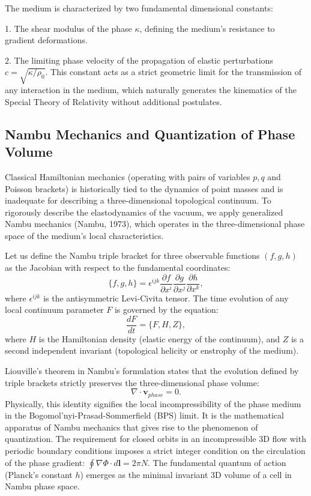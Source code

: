 \documentclass[12pt,a4paper]{article}
\begin{document}
The medium is characterized by two fundamental dimensional constants:

1. The shear modulus of the phase $\kappa$, defining the medium's resistance to gradient deformations.

2. The limiting phase velocity of the propagation of elastic perturbations $c = \sqrt{\kappa / \rho_0}$. This constant acts as a strict geometric limit for the transmission of any interaction in the medium, which naturally generates the kinematics of the Special Theory of Relativity without additional postulates.

\subsection{Nambu Mechanics and Quantization of Phase Volume}
Classical Hamiltonian mechanics (operating with pairs of variables $p, q$ and Poisson brackets) is historically tied to the dynamics of point masses and is inadequate for describing a three-dimensional topological continuum. To rigorously describe the elastodynamics of the vacuum, we apply generalized Nambu mechanics (Nambu, 1973), which operates in the three-dimensional phase space of the medium's local characteristics.

Let us define the Nambu triple bracket for three observable functions $(f, g, h)$ as the Jacobian with respect to the fundamental coordinates:
\begin{equation}
	\{f, g, h\} = \epsilon^{ijk} \frac{\partial f}{\partial x^i} \frac{\partial g}{\partial x^j} \frac{\partial h}{\partial x^k},
\end{equation}
where $\epsilon^{ijk}$ is the antisymmetric Levi-Civita tensor.
The time evolution of any local continuum parameter $F$ is governed by the equation:
\begin{equation}
	\frac{dF}{dt} = \{F, H, Z\},
\end{equation}
where $H$ is the Hamiltonian density (elastic energy of the continuum), and $Z$ is a second independent invariant (topological helicity or enstrophy of the medium). 

Liouville's theorem in Nambu's formulation states that the evolution defined by triple brackets strictly preserves the three-dimensional phase volume:
\begin{equation}
	\nabla \cdot \mathbf{v}_{phase} = 0.
\end{equation}
Physically, this identity signifies the local incompressibility of the phase medium in the Bogomol'nyi-Prasad-Sommerfield (BPS) limit. 
It is the mathematical apparatus of Nambu mechanics that gives rise to the phenomenon of quantization. The requirement for closed orbits in an incompressible 3D flow with periodic boundary conditions imposes a strict integer condition on the circulation of the phase gradient: $\oint \nabla \Phi \cdot d\mathbf{l} = 2\pi N$. The fundamental quantum of action (Planck's constant $h$) emerges as the minimal invariant 3D volume of a cell in Nambu phase space.
\end{document}
